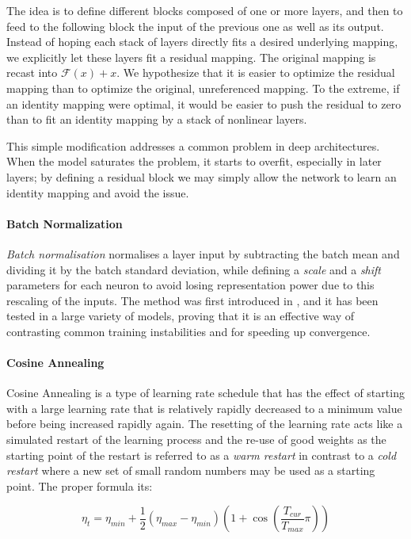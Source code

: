 The idea is to define different blocks composed of one or more layers, and then to feed to the following block the input of the previous one as well as its output. Instead of hoping each stack of layers directly fits a desired underlying mapping, we explicitly let these layers fit a residual mapping. The original mapping is recast into $\mathcal{F}(x) + x$. We hypothesize that it is easier to optimize the residual mapping than to optimize the original, unreferenced mapping. To the extreme, if an identity mapping were optimal, it would be easier to push the residual to zero than to fit an identity mapping by a stack of nonlinear layers. 

This simple modification addresses a common problem in deep architectures. When the model saturates the problem, it starts to overfit, especially in later layers; by defining a residual block we may simply allow the network to learn an identity mapping and avoid the issue.

\paragraph{Batch Normalization}
\emph{Batch normalisation} normalises a layer input by subtracting the batch mean and dividing it by the batch standard deviation, while defining a \emph{scale} and a \emph{shift} parameters for each neuron to avoid losing representation power due to this rescaling of the inputs. The method was first introduced in \cite{https://doi.org/10.48550/arxiv.1502.03167}, and it has been tested in a large variety of models, proving that it is an effective way of contrasting common training instabilities and for speeding up convergence.

\paragraph{Cosine Annealing}
Cosine Annealing is a type of learning rate schedule that has the effect of starting with a large learning rate that is relatively rapidly decreased to a minimum value before being increased rapidly again. The resetting of the learning rate acts like a simulated restart of the learning process and the re-use of good weights as the starting point of the restart is referred to as a \emph{warm restart} in contrast to a \emph{cold restart} where a new set of small random numbers may be used as a starting point. The proper formula its:

\[\eta_{t} = \eta_{min} + \frac{1}{2}\left(\eta_{max}-\eta_{min}\right)\left(1+\cos\left(\frac{T_{cur}}{T_{max}}\pi\right)\right)\]

